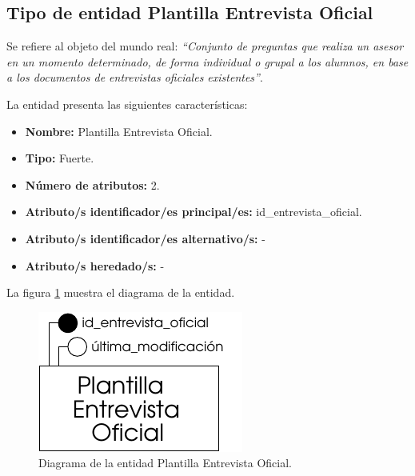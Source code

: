 \subsection{Tipo de entidad Plantilla Entrevista Oficial}

   \begin{description}

   \item[Definición] Se refiere al objeto del mundo real: \emph{``Conjunto de
   preguntas que realiza un asesor en un momento determinado, de forma
   individual o grupal a los alumnos, en base a los documentos de entrevistas
   oficiales existentes''}.

   \item[Características] La entidad presenta las siguientes características:
      \begin{itemize}
         \item \textbf{Nombre:} Plantilla Entrevista Oficial.
         \item \textbf{Tipo:} Fuerte.
         \item \textbf{Número de atributos:} 2.
         \item \textbf{Atributo/s identificador/es principal/es:} id\_entrevista\_oficial.
         \item \textbf{Atributo/s identificador/es alternativo/s:} -
         \item \textbf{Atributo/s heredado/s:} -
      \end{itemize}

   \item[Diagrama] La figura \ref{diagramaPlantEntOfi} muestra el diagrama de la entidad.
   \item \begin{figure}[!ht]
            \begin{center}
            \includegraphics[]{07.Modelo_Entidad-Interrelacion/7.2.Analisis_Entidades/diagramas/plant_ent_ofi.pdf}
            \caption{Diagrama de la entidad Plantilla Entrevista Oficial.}
            \label{diagramaPlantEntOfi}
            \end{center}
         \end{figure}


\end{description}

